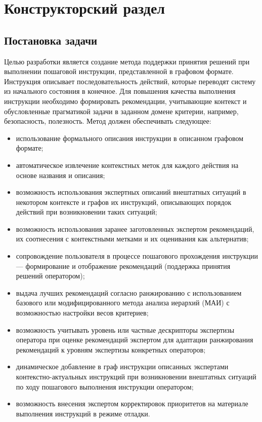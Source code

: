 \chapter{Конструкторский раздел}

\section{Постановка задачи} 
Целью разработки является создание метода поддержки принятия решений при выполнении пошаговой инструкции, представленной в графовом формате. 
Инструкция описывает последовательность действий, которые переводят систему из начального состояния в конечное.
Для повышения качества выполнения инструкции необходимо формировать рекомендации, учитывающие контекст и обусловленные прагматикой задачи в заданном домене критерии, например, безопасность, полезность. 
Метод должен обеспечивать следующее:
\begin{itemize}
    \item использование формального описания инструкции в описанном графовом формате;
    \item автоматическое извлечение контекстных меток для каждого действия на основе названия и описания;
    \item возможность использования экспертных описаний внештатных ситуаций в некотором контексте и графов их инструкций, описывающих порядок действий при возникновении таких ситуаций;
    \item возможность использования заранее заготовленных экспертом рекомендаций, их соотнесения с контекстными метками и их оценивания как альтернатив; 
    \item сопровождение пользователя в процессе пошагового прохождения инструкции --- формирование и отображение рекомендаций (поддержка принятия решений оператором);
    \item выдача лучших рекомендаций согласно ранжированию с использованием базового или модифицированного метода анализа иерархий (МАИ) с возможностью настройки весов критериев;
    \item возможность учитывать уровень или частные дескрипторы экспертизы оператора при оценке рекомендаций экспертом для адаптации ранжирования рекомендаций к уровням экспертизы конкретных операторов;
    \item %
    динамическое добавление в граф инструкции описанных экспертами контекстно-актуальных инструкций при возникновении внештатных ситуаций по ходу пошагового выполнения инструкции оператором;
    \item возможность внесения экспертом корректировок приоритетов на материале выполнения инструкций в режиме отладки.  
\end{itemize}

